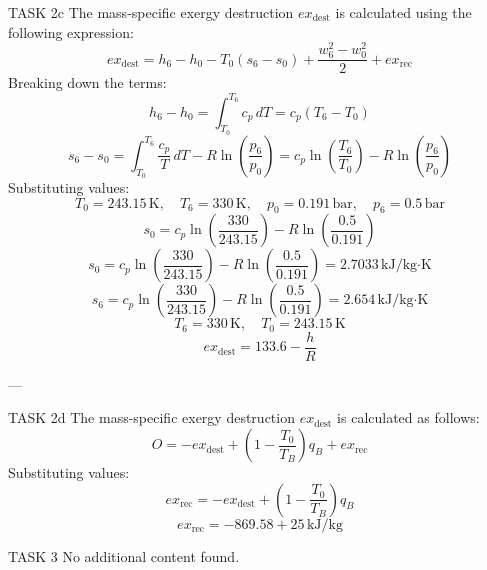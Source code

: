 TASK 2c  
The mass-specific exergy destruction \( ex_{\text{dest}} \) is calculated using the following expression:  
\[
ex_{\text{dest}} = h_6 - h_0 - T_0 (s_6 - s_0) + \frac{w_6^2 - w_0^2}{2} + ex_{\text{rec}}
\]  
Breaking down the terms:  
\[
h_6 - h_0 = \int_{T_0}^{T_6} c_p \, dT = c_p (T_6 - T_0)
\]  
\[
s_6 - s_0 = \int_{T_0}^{T_6} \frac{c_p}{T} \, dT - R \ln \left( \frac{p_6}{p_0} \right) = c_p \ln \left( \frac{T_6}{T_0} \right) - R \ln \left( \frac{p_6}{p_0} \right)
\]  
Substituting values:  
\[
T_0 = 243.15 \, \text{K}, \quad T_6 = 330 \, \text{K}, \quad p_0 = 0.191 \, \text{bar}, \quad p_6 = 0.5 \, \text{bar}
\]  
\[
s_0 = c_p \ln \left( \frac{330}{243.15} \right) - R \ln \left( \frac{0.5}{0.191} \right)
\]  
\[
s_0 = c_p \ln \left( \frac{330}{243.15} \right) - R \ln \left( \frac{0.5}{0.191} \right) = 2.7033 \, \text{kJ/kg·K}
\]  
\[
s_6 = c_p \ln \left( \frac{330}{243.15} \right) - R \ln \left( \frac{0.5}{0.191} \right) = 2.654 \, \text{kJ/kg·K}
\]  
\[
T_6 = 330 \, \text{K}, \quad T_0 = 243.15 \, \text{K}
\]  
\[
ex_{\text{dest}} = 133.6 - \frac{h}{R}
\]  

---

TASK 2d  
The mass-specific exergy destruction \( ex_{\text{dest}} \) is calculated as follows:  
\[
O = -ex_{\text{dest}} + \left( 1 - \frac{T_0}{T_B} \right) q_B + ex_{\text{rec}}
\]  
Substituting values:  
\[
ex_{\text{rec}} = -ex_{\text{dest}} + \left( 1 - \frac{T_0}{T_B} \right) q_B
\]  
\[
ex_{\text{rec}} = -869.58 + 25 \, \text{kJ/kg}
\]  

TASK 3  
No additional content found.